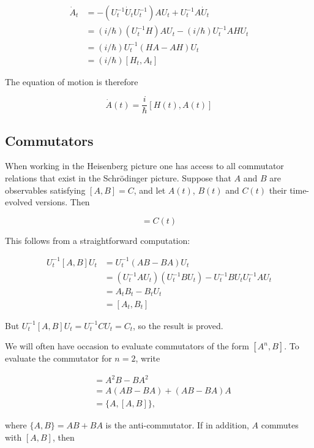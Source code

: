 \begin{align}
\dot A_t &= - (U_t^{-1}  \dot U_t U_t^{-1} ) A U_t + U_t^{-1}A\dot U_t \\
&=  (i/\hbar)(U_t^{-1}  H) A U_t - (i/\hbar) U_t^{-1}A HU_t \\
&=  (i/\hbar)U_t^{-1} (HA - AH)U_t  \\
&=  (i/\hbar)[H_t ,A_t] 
\end{align}

The equation of motion is therefore

\begin{equation}
\dot A(t) =  \frac{i}{\hbar}[H(t),A(t)] 
\end{equation}


\subsection{Commutators}

When working in  the Heisenberg picture one has access to all commutator relations that exist in the Schrödinger picture. Suppose that $A$ and $B$ are observables satisfying $[A,B] = C$, and let $A(t)$, $B(t)$ and $C(t)$ their time-evolved versions. 
Then 

\begin{equation}
[A(t), B(t)] = C(t)
\end{equation}

This follows from a straightforward computation:

\begin{align}
U_t^{-1} [A, B] U_t&= U_t^{-1} (AB  - BA) U_t \\
&= (U_t^{-1} AU_t)(U_t^{-1} BU_t) 
 - U_t^{-1}BU_t U_t^{-1} AU_t \\
&= A_tB_t - B_t  U_t \\
&= [A_t, B_t] 
\end{align}

But $U_t^{-1} [A, B] U_t = U_t^{-1} C U_t = C_t$, so the result is proved.

We will often have occasion to evaluate commutators of the form $[A^n,B]$.
To evaluate the commutator for  $n=2$, write

\begin{align}
[A^2, B] &= A^2B - BA^2 \\
 &= A (AB - BA) + (AB - BA) A \\
 &= \{A, [A, B] \},
\end{align}

where $\{A,B\} = AB + BA$ is the anti-commutator.  If in addition, $A$ commutes with $[A,B]$, then 

